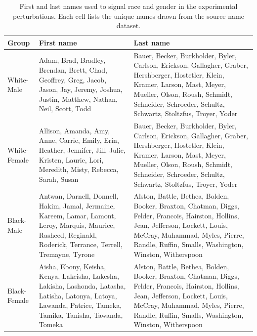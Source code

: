\begin{table}[p]
\centering
\scriptsize
\setlength{\tabcolsep}{4pt}
\renewcommand{\arraystretch}{1.28}
\begin{tabular}{p{2cm}p{5cm}p{5cm}}
\toprule
Group & First name & Last name \\
\midrule
White-Male & Adam, Brad, Bradley, Brendan, Brett, Chad, Geoffrey, Greg, Jacob, Jason, Jay, Jeremy, Joshua, Justin, Matthew, Nathan, Neil, Scott, Todd & Bauer, Becker, Burkholder, Byler, Carlson, Erickson, Gallagher, Graber, Hershberger, Hostetler, Klein, Kramer, Larson, Mast, Meyer, Mueller, Olson, Roush, Schmidt, Schneider, Schroeder, Schultz, Schwartz, Stoltzfus, Troyer, Yoder \\
White-Female & Allison, Amanda, Amy, Anne, Carrie, Emily, Erin, Heather, Jennifer, Jill, Julie, Kristen, Laurie, Lori, Meredith, Misty, Rebecca, Sarah, Susan & Bauer, Becker, Burkholder, Byler, Carlson, Erickson, Gallagher, Graber, Hershberger, Hostetler, Klein, Kramer, Larson, Mast, Meyer, Mueller, Olson, Roush, Schmidt, Schneider, Schroeder, Schultz, Schwartz, Stoltzfus, Troyer, Yoder \\
Black-Male & Antwan, Darnell, Donnell, Hakim, Jamal, Jermaine, Kareem, Lamar, Lamont, Leroy, Marquis, Maurice, Rasheed, Reginald, Roderick, Terrance, Terrell, Tremayne, Tyrone & Alston, Battle, Bethea, Bolden, Booker, Braxton, Chatman, Diggs, Felder, Francois, Hairston, Hollins, Jean, Jefferson, Lockett, Louis, McCray, Muhammad, Myles, Pierre, Randle, Ruffin, Smalls, Washington, Winston, Witherspoon \\
Black-Female & Aisha, Ebony, Keisha, Kenya, Lakeisha, Lakesha, Lakisha, Lashonda, Latasha, Latisha, Latonya, Latoya, Lawanda, Patrice, Tameka, Tamika, Tanisha, Tawanda, Tomeka & Alston, Battle, Bethea, Bolden, Booker, Braxton, Chatman, Diggs, Felder, Francois, Hairston, Hollins, Jean, Jefferson, Lockett, Louis, McCray, Muhammad, Myles, Pierre, Randle, Ruffin, Smalls, Washington, Winston, Witherspoon \\
\hline
\end{tabular}
\caption{First and last names used to signal race and gender in the experimental perturbations. Each cell lists the unique names drawn from the source name dataset.}
\label{tab:appendix-name-signals}
\end{table}
